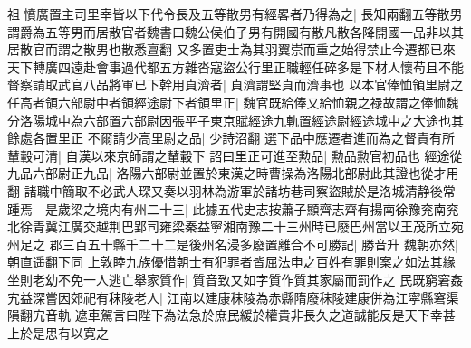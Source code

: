 祖憤廣置主司里宰皆以下代令長及五等散男有經畧者乃得為之|{
	長知兩翻五等散男謂爵為五等男而居散官者魏書曰魏公侯伯子男有開國有散凡散各降開國一品非以其居散官而謂之散男也散悉亶翻}
又多置吏士為其羽翼崇而重之始得禁止今遷都已來天下轉廣四遠赴會事過代都五方雜沓寇盜公行里正職輕任碎多是下材人懷苟且不能督察請取武官八品將軍已下幹用貞濟者|{
	貞濟謂堅貞而濟事也}
以本官俸恤領里尉之任高者領六部尉中者領經途尉下者領里正|{
	魏官既給俸又給恤親之禄故謂之俸恤魏分洛陽城中為六部置六部尉因張平子東京賦經途九軌置經途尉經途城中之大途也其餘處各置里正}
不爾請少高里尉之品|{
	少詩沼翻}
選下品中應遷者進而為之督責有所輦轂可清|{
	自漢以來京師謂之輦轂下}
詔曰里正可進至勲品|{
	勲品勲官初品也}
經途從九品六部尉正九品|{
	洛陽六部尉並置於東漢之時曹操為洛陽北部尉此其證也從才用翻}
諸職中簡取不必武人琛又奏以羽林為游軍於諸坊巷司察盜賊於是洛城清静後常踵焉　是歲梁之境内有州二十三|{
	此據五代史志按蕭子顯齊志齊有揚南徐豫兖南兖北徐青冀江廣交越荆巴郢司雍梁秦益寧湘南豫二十三州時已廢巴州當以王茂所立宛州足之}
郡三百五十縣千二十二是後州名浸多廢置離合不可勝記|{
	勝音升}
魏朝亦然|{
	朝直遥翻下同}
上敦睦九族優惜朝士有犯罪者皆屈法申之百姓有罪則案之如法其緣坐則老幼不免一人逃亡舉家質作|{
	質音致又如字質作質其家屬而罰作之}
民既窮窘姦宄益深嘗因郊祀有秣陵老人|{
	江南以建康秣陵為赤縣隋廢秣陵建康併為江寜縣窘渠隕翻宄音軌}
遮車駕言曰陛下為法急於庶民緩於權貴非長久之道誠能反是天下幸甚上於是思有以寛之

